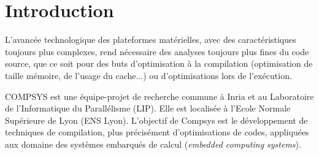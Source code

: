 \documentclass[11pt]{article}
\author{\fontsize{14}{14}{\bf Aurélien CHEMIER}}
\title{\fontsize{16}{16}{{\bf Rapport de TER: Analyse de pointeur dans LLVM}}}
\date{\fontsize{11}{11}{Janvier-Février 2014}}
\begin{document}
\thispagestyle{empty}
\maketitle

\begin{abstract}
  Les optimisations réalisées à l'intérieur d'un compilateur, pour
  améliorer l'efficacité du code généré, ont besoin d'informations
  détectées statiquement (taille des tableaux, variables constantes,
  etc).  Certaines de ces analyses très utiles, ne fonctionnent que
  dans des cas "syntaxiquement simples". L'objectif de ce TER est
  d'améliorer le domaine d'application des optimisations de tableaux
  réalisées dans l'équipe Compsys. En effet, ces optimisations sont
  pour le moment restreintes à des tableaux de taille statique, et à
  des programmes qui ne contiennent aucune utilisation de pointeurs.

 \par Or, on constate souvent que les pointeurs ne sont utilisés en C
 que de façon rudimentaire : transmission d'arguments par adresses,
 allocation dynamique de tableau réalisée une unique fois,
 descripteurs de tableaux, pseudo-indices.
  
  \par L'objectif est donc de réaliser un outil de détection de ces
  usages simples et de transformer  le programme initial en un
  programme \textit{sémantiquement} équivalent qu'on pourra ensuite
  optimiser en utilisant les outils de l'équipe.\\
  \textbf{Mots clefs}:  Optimisation, pointeurs, C
\end{abstract}


\tableofcontents


\newpage
\section{Introduction}
  L'avancée technologique des plateformes matérielles, avec des caractéristiques toujours plus complexes, 
  rend nécessaire des analyses toujours plus fines du code source, que ce soit pour des buts 
  d'optimisation à la compilation (optimisation de taille mémoire, de l'usage du cache...) ou d'optimisations lors de l'exécution.
  
  COMPSYS est une équipe-projet de recherche commune à Inria et au Laboratoire de l'Informatique du Parallélisme (LIP).
  Elle est localisée à l'Ecole Normale Supérieure de Lyon (ENS Lyon).
  L'objectif de Compsys est le développement de techniques de compilation, plus précisément d'optimisations de codes, 
  appliquées aux domaine des systèmes embarqués de calcul (\emph{embedded computing systems}).
  
\end{document}
